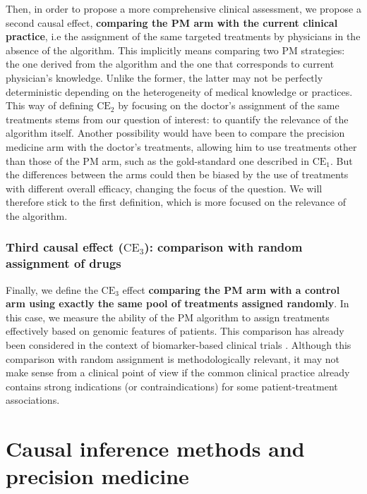 \documentclass[a4paper,12pt,twoside,onecolumn,openright,final,oldfontcommands]{memoir}
\begin{document}
Then, in order to propose a more comprehensive clinical assessment, we
propose a second causal effect, \textbf{comparing the PM arm with the
current clinical practice}, i.e the assignment of the same targeted
treatments by physicians in the absence of the algorithm. This
implicitly means comparing two PM strategies: the one derived from the
algorithm and the one that corresponds to current physician's knowledge.
Unlike the former, the latter may not be perfectly deterministic
depending on the heterogeneity of medical knowledge or practices. This
way of defining \(\text{CE}_2\) by focusing on the doctor's assignment
of the same treatments stems from our question of interest: to quantify
the relevance of the algorithm itself. Another possibility would have
been to compare the precision medicine arm with the doctor's treatments,
allowing him to use treatments other than those of the PM arm, such as
the gold-standard one described in \(\text{CE}_1\). But the differences
between the arms could then be biased by the use of treatments with
different overall efficacy, changing the focus of the question. We will
therefore stick to the first definition, which is more focused on the
relevance of the algorithm.

\subsubsection{\texorpdfstring{Third causal effect (\(\text{CE}_3\)):
comparison with random assignment of
drugs}{Third causal effect (\textbackslash{}text\{CE\}\_3): comparison with random assignment of drugs}}\label{third-causal-effect-textce_3-comparison-with-random-assignment-of-drugs}

Finally, we define the \(\text{CE}_3\) effect \textbf{comparing the PM
arm with a control arm using exactly the same pool of treatments
assigned randomly}. In this case, we measure the ability of the PM
algorithm to assign treatments effectively based on genomic features of
patients. This comparison has already been considered in the context of
biomarker-based clinical trials \citep{sargent2005clinical}. Although
this comparison with random assignment is methodologically relevant, it
may not make sense from a clinical point of view if the common clinical
practice already contains strong indications (or contraindications) for
some patient-treatment associations.

\section{Causal inference methods and precision
medicine}\label{causal-inference-methods-and-precision-medicine}
\end{document}
